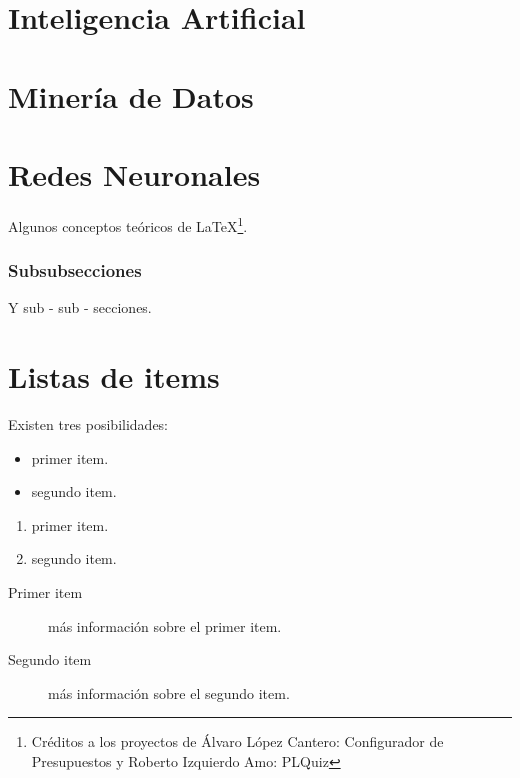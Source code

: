 \section{Inteligencia Artificial}




\section{Minería de Datos}




\section{Redes Neuronales}









\indexspace
\indexspace
\indexspace
\indexspace
Algunos conceptos teóricos de \LaTeX \footnote{Créditos a los proyectos de Álvaro López Cantero: Configurador de Presupuestos y Roberto Izquierdo Amo: PLQuiz}.


\subsubsection{Subsubsecciones}

Y sub - sub - secciones. 


\section{Listas de items}

Existen tres posibilidades:

\begin{itemize}
	\item primer item.
	\item segundo item.
\end{itemize}

\begin{enumerate}
	\item primer item.
	\item segundo item.
\end{enumerate}

\begin{description}
	\item[Primer item] más información sobre el primer item.
	\item[Segundo item] más información sobre el segundo item.
\end{description}
	
